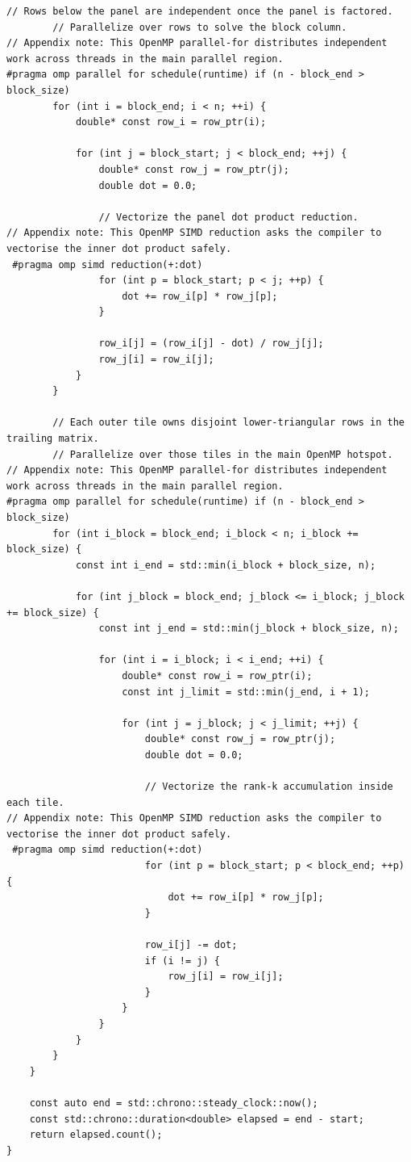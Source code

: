 \begin{lstlisting}[style=appendixcode]
        // Rows below the panel are independent once the panel is factored.
        // Parallelize over rows to solve the block column.
// Appendix note: This OpenMP parallel-for distributes independent work across threads in the main parallel region.
#pragma omp parallel for schedule(runtime) if (n - block_end > block_size)
        for (int i = block_end; i < n; ++i) {
            double* const row_i = row_ptr(i);

            for (int j = block_start; j < block_end; ++j) {
                double* const row_j = row_ptr(j);
                double dot = 0.0;

                // Vectorize the panel dot product reduction.
// Appendix note: This OpenMP SIMD reduction asks the compiler to vectorise the inner dot product safely.
 #pragma omp simd reduction(+:dot)
                for (int p = block_start; p < j; ++p) {
                    dot += row_i[p] * row_j[p];
                }

                row_i[j] = (row_i[j] - dot) / row_j[j];
                row_j[i] = row_i[j];
            }
        }

        // Each outer tile owns disjoint lower-triangular rows in the trailing matrix.
        // Parallelize over those tiles in the main OpenMP hotspot.
// Appendix note: This OpenMP parallel-for distributes independent work across threads in the main parallel region.
#pragma omp parallel for schedule(runtime) if (n - block_end > block_size)
        for (int i_block = block_end; i_block < n; i_block += block_size) {
            const int i_end = std::min(i_block + block_size, n);

            for (int j_block = block_end; j_block <= i_block; j_block += block_size) {
                const int j_end = std::min(j_block + block_size, n);

                for (int i = i_block; i < i_end; ++i) {
                    double* const row_i = row_ptr(i);
                    const int j_limit = std::min(j_end, i + 1);

                    for (int j = j_block; j < j_limit; ++j) {
                        double* const row_j = row_ptr(j);
                        double dot = 0.0;

                        // Vectorize the rank-k accumulation inside each tile.
// Appendix note: This OpenMP SIMD reduction asks the compiler to vectorise the inner dot product safely.
 #pragma omp simd reduction(+:dot)
                        for (int p = block_start; p < block_end; ++p) {
                            dot += row_i[p] * row_j[p];
                        }

                        row_i[j] -= dot;
                        if (i != j) {
                            row_j[i] = row_i[j];
                        }
                    }
                }
            }
        }
    }

    const auto end = std::chrono::steady_clock::now();
    const std::chrono::duration<double> elapsed = end - start;
    return elapsed.count();
}
\end{lstlisting}

